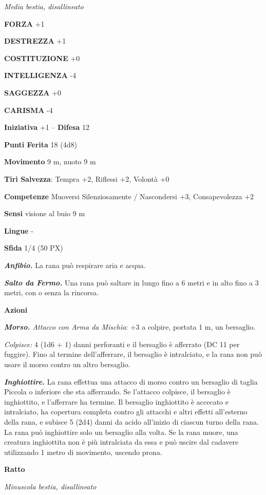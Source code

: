 \begin{multicols}{2}
\textit{Media bestia, disallineato}

\textbf{FORZA} +1

\textbf{DESTREZZA} +1

\textbf{COSTITUZIONE} +0

\textbf{INTELLIGENZA} -4

\textbf{SAGGEZZA} +0

\textbf{CARISMA} -4

\textbf{Iniziativa} +1 -- \textbf{Difesa} 12

\textbf{Punti Ferita} 18 (4d8)

\textbf{Movimento} 9 m, nuoto 9 m

\textbf{Tiri Salvezza}: Tempra +2, Riflessi +2, Volontà +0

\textbf{Competenze} Muoversi Silenziosamente / Nascondersi +3, Consapevolezza +2

\textbf{Sensi} visione al buio 9 m

\textbf{Lingue} -

\textbf{Sfida} 1/4 (50 PX)

\textit{\textbf{Anfibio.}} La rana può respirare aria e acqua.

\textit{\textbf{Salto da Fermo.}} Una rana può saltare in lungo fino a 6 metri e in alto fino a 3 metri, con o senza la rincorsa.

\textbf{Azioni}

\textit{\textbf{Morso.} Attacco con Arma da Mischia}: +3 a colpire, portata 1 m, un bersaglio.

\textit{Colpisce:} 4 (1d6 + 1) danni perforanti e il bersaglio è afferrato (DC 11 per fuggire). Fino al termine dell'afferrare, il bersaglio è intralciato, e la rana non può usare il morso contro un altro bersaglio.

\textit{\textbf{Inghiottire.}} La rana effettua una attacco di morso contro un bersaglio di taglia Piccola o inferiore che sta afferrando. Se l'attacco colpisce, il bersaglio è inghiottito, e l'afferrare ha termine. Il bersaglio inghiottito è accecato e intralciato, ha copertura completa contro gli attacchi e altri effetti all'esterno della rana, e subisce 5 (2d4) danni da acido all'inizio di ciascun turno della rana. La rana può inghiottire solo un bersaglio alla volta. Se la rana muore, una creatura inghiottita non è più intralciata da essa e può uscire dal cadavere utilizzando 1 metro di movimento, uscendo prona.

\medskip\textbf{Ratto}

\textit{Minuscola bestia, disallineato}


\end{multicols}
